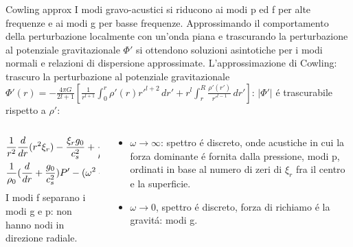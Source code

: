 \begin{frame}{Cowling approx}
    I modi gravo-acustici si riducono ai modi p ed f per alte frequenze e ai modi g per basse frequenze. Approssimando il comportamento della perturbazione localmente con un'onda piana e trascurando la perturbazione al potenziale gravitazionale $\Phi'$ si ottendono soluzioni asintotiche per i modi normali e relazioni di dispersione approssimate. L'approssimazione di Cowling: trascuro la perturbazione al potenziale gravitazionale $\Phi'(r)=-\frac{4\pi G}{2l+1}\left[\frac{1}{r^{l+1}}\int_0^r\rho'(r)r'^{l+2}\,dr'+r^l\int_r^R\frac{\rho'(r')}{r'^{l-1}}\,dr'\right]$: $|\Phi'|$ \'e trascurabile rispetto a $\rho'$:
\begin{columns}[T]
    \begin{column}{0.5\textwidth}
\begin{align*}
&\frac{1}{r^2}\frac{d}{d r}(r^2\xi_r)-\frac{\xi_rg_0}{c_s^2}+\frac{1}{\rho_0}(\frac{1}{c_s^2}-\frac{l(l+1)}{r^2\omega^2})P'=0\\
&\frac{1}{\rho_0}(\frac{d}{d r}+\frac{g_0}{c_s^2})P'-(\omega^2-N^2)\xi_r=0
\end{align*}
I modi f separano i modi g e p: non hanno nodi in direzione radiale.
    \end{column}
    \begin{column}{0.5\textwidth}
\begin{itemize}
\item $\omega\to\infty$: spettro \'e discreto, onde acustiche in cui la forza dominante \'e fornita dalla pressione, modi p, ordinati in base al numero di zeri di $\xi_r$ fra il centro e la superficie.
\item $\omega\to0$, spettro \'e discreto, forza di richiamo \'e la gravit\'a: modi g.
\end{itemize}
    \end{column}
\end{columns}

\end{frame}
